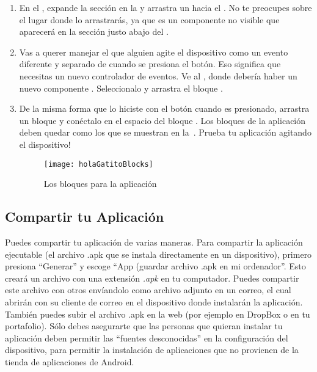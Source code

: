 \begin{enumerate}

\item En el \designer, expande la sección \sensors en la \palette y
  arrastra un  hacia el \viewer. No te
  preocupes sobre el lugar donde lo arrastrarás, ya que es un
  componente no visible que aparecerá en la sección justo abajo del
  \viewer.

\item Vas a querer manejar el que alguien agite el dispositivo como un
  evento diferente y separado de cuando se presiona el botón. Eso
  significa que necesitas un nuevo controlador de eventos. Ve al
  \blockEditor, donde debería haber un nuevo componente
  . Seleccionalo y arrastra el bloque
  .

\item De la misma forma que lo hiciste con el botón cuando es
  presionado, arrastra un bloque  y
  conéctalo en el espacio del bloque . Los
  bloques de la aplicación deben quedar como los que se muestran en
  la~. Prueba tu aplicación agitando el
  dispositivo!

\begin{figure}[H]
\centering
\texttt{[image: holaGatitoBlocks]}
\caption{Los bloques para la aplicación }
\label{fig:holaGatitoBlocks}
\end{figure}

\end{enumerate}

\subsection*{Compartir tu Aplicación}

Puedes compartir tu aplicación de varias maneras. Para compartir la
aplicación ejecutable (el archivo .apk que se instala directamente en
un dispositivo), primero presiona ``Generar'' y escoge ``App (guardar
archivo .apk en mi ordenador''. Esto creará un archivo con una
extensión \emph{.apk} en tu computador. Puedes compartir este archivo
con otros envíandolo como archivo adjunto en un correo, el cual
abrirán con su cliente de correo en el dispositivo donde instalarán la
aplicación. También puedes subir el archivo .apk en la web (por
ejemplo en DropBox o en tu portafolio). Sólo debes asegurarte que las
personas que quieran instalar tu aplicación deben permitir las
``fuentes desconocidas'' en la configuración del dispositivo, para
permitir la instalación de aplicaciones que no provienen de la tienda
de aplicaciones de Android.


